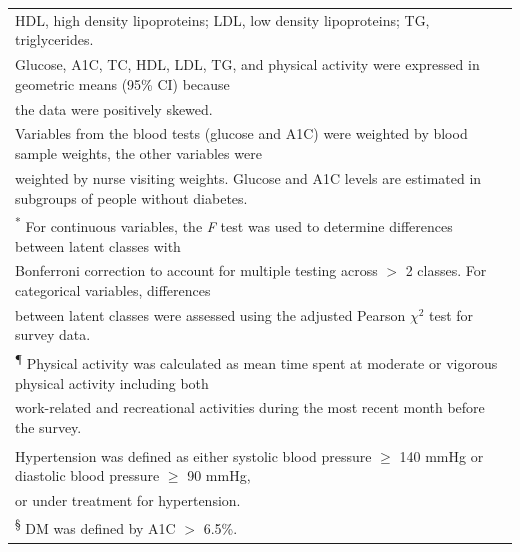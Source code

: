 \begin{table}[H]
\begin{tabular}[t]{lcccc}
		\multicolumn{5}{l}{{\scriptsize HDL, high density lipoproteins; LDL, low density lipoproteins; TG, triglycerides.}} \\
		\multicolumn{5}{l}{{\scriptsize Glucose, A1C, TC, HDL, LDL, TG, and physical activity were expressed in geometric means (95\% CI) because }} \\
		\multicolumn{5}{l}{ the data were positively skewed.} \\
		\multicolumn{5}{l}{{\scriptsize Variables from the blood tests (glucose and A1C) were weighted by blood sample weights, the other variables were}}\\ 
		\multicolumn{5}{l}{{\scriptsize  weighted by nurse visiting weights. Glucose and A1C levels are estimated in subgroups of people without diabetes.}}\\
		\multicolumn{5}{l}{\textsuperscript{*} For continuous variables, the \textit{F} test was used to determine differences between latent classes with}\\ 
		\multicolumn{5}{l}{{\scriptsize  Bonferroni correction to account for multiple testing across $>$ 2 classes. For categorical variables, differences}}\\
		\multicolumn{5}{l}{{\scriptsize  between latent classes were assessed using the adjusted Pearson $\chi^2$ test for survey data.}}\\ 
		\multicolumn{5}{l}{{\scriptsize \textsuperscript{\P} Physical activity was calculated as mean time spent at moderate or vigorous physical activity including both }}\\
		\multicolumn{5}{l}{{\scriptsize work-related and recreational activities during the most recent month before the survey.}}\\
		
		\multicolumn{5}{l}{{\scriptsize \textsuperscript{\dag} Hypertension was defined as either systolic blood pressure $\geqslant$ 140 mmHg or diastolic blood pressure $\geqslant$ 90 mmHg,}}\\
		\multicolumn{5}{l}{{\scriptsize or under treatment for hypertension.}}\\
		\multicolumn{5}{l}{{\scriptsize \textsuperscript{\S} DM was defined by A1C $>$ 6.5\%.}}\\
	\end{tabular}
\end{table}

